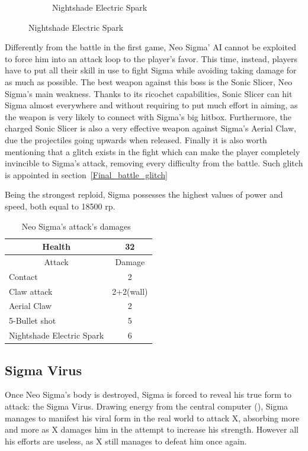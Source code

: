 \begin{figure}[htp]
\begin{subfigure}{0.6\linewidth}
		\caption{Nightshade Electric Spark}
	\end{subfigure}
\end{figure}
Differently from the battle in the first game, Neo Sigma' AI cannot be exploited to force him into an attack loop to the player's favor. This time, instead, players have to put all their skill in use to fight Sigma while avoiding taking damage for as much as possible. The best weapon against this boss is the Sonic Slicer, Neo Sigma's main weakness. Thanks to its ricochet capabilities, Sonic Slicer can hit Sigma almost everywhere and without requiring to put much effort in aiming, as the weapon is very likely to connect with Sigma's big hitbox. Furthermore, the charged Sonic Slicer is also a very effective weapon against Sigma's Aerial Claw, due the projectiles going  upwards when released. Finally it is also worth mentioning that a glitch exists in the fight which can make the player completely invincible to Sigma's attack, removing every difficulty from the battle. Such glitch is appointed in section~\ref{Final_battle_glitch}

Being the strongest reploid, Sigma possesses the highest values of power and speed, both equal to 18500 rp.
\begin{table}[htp]
	\centering
	\begin{tabular}[h]{l c}
		\toprule
		\multicolumn{1}{c}{Health}  & 32 \\
		\midrule
		\multicolumn{1}{c}{Attack} & \multicolumn{1}{c}{Damage}\\
		Contact & 2 \\
		Claw attack & 2+2(wall)\\
		Aerial Claw& 2\\
		5-Bullet shot& 5\\
		Nightshade Electric Spark& 6\\
		\bottomrule
	\end{tabular}
	\caption{Neo Sigma's attack's damages~\cite{wiki:Neo_sigma}}
\end{table}
\subsection{Sigma Virus}\label{boss:Sigma_virus}
Once Neo Sigma's body is destroyed, Sigma is forced to reveal his true form to attack: the Sigma Virus. Drawing energy from the central computer (\cite{wayback:X2_resources}), Sigma manages to manifest his viral form in the real world to attack X, absorbing more and more as X damages him in the attempt to increase his strength. However all his efforts are useless, as X still manages to defeat him once again.

